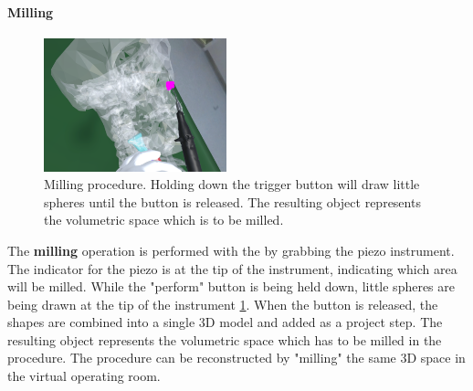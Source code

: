 \paragraph{Milling}

\begin{figure}[ht]
    \centering
    \includegraphics[width=200px]{images/implementation/features/procedures/piezo.png}
    \caption{\label{fig::FeaturePiezo}Milling procedure. Holding down the trigger button will draw little spheres until the button is released. The resulting object represents the volumetric space which is to be milled.}
\end{figure}

The \textbf{milling} operation is performed with the by grabbing the piezo instrument.
The indicator for the piezo is at the tip of the instrument, indicating which area will be milled.
While the "perform" button is being held down, little spheres are being drawn at the tip of the instrument \ref{fig::FeaturePiezo}.
When the button is released, the shapes are combined into a single 3D model and added as a project step.
The resulting object represents the volumetric space which has to be milled in the procedure.
The procedure can be reconstructed by "milling" the same 3D space in the virtual operating room.
